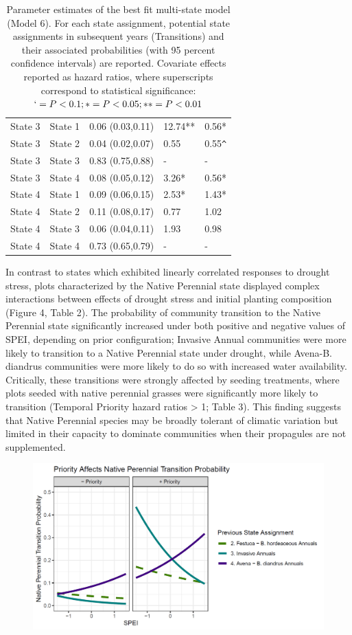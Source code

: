 \documentclass[twoside,12pt,final]{ucthesis-CA2012}
\begin{document}
\begin{ucmainmatter}
\begin{table}[ht]
\begin{tabular}{lllll}
  State 3 & State 1 & 0.06 (0.03,0.11) & 12.74** & 0.56* \\ 
  State 3 & State 2 & 0.04 (0.02,0.07) & 0.55 & 0.55\verb|^| \\ 
  State 3 & State 3 & 0.83 (0.75,0.88) & - & - \\ 
  State 3 & State 4 & 0.08 (0.05,0.12) & 3.26* & 0.56* \\ 
  State 4 & State 1 & 0.09 (0.06,0.15) & 2.53* & 1.43* \\ 
  State 4 & State 2 & 0.11 (0.08,0.17) & 0.77 & 1.02 \\ 
  State 4 & State 3 & 0.06 (0.04,0.11) & 1.93 & 0.98 \\ 
  State 4 & State 4 & 0.73 (0.65,0.79) & - & - \\ 
   \hline
\end{tabular}
\caption{Parameter estimates of the best fit multi-state model (Model 6). For each state assignment, potential state assignments in subsequent years (Transitions) and their associated probabilities (with 95 percent confidence intervals) are reported. Covariate effects reported as hazard ratios, where superscripts correspond to statistical significance: $` = P < 0.1; * = P < 0.05; ** = P < 0.01$} 
\end{table}
In contrast to states which exhibited linearly correlated responses to drought stress, plots characterized by the Native Perennial state displayed complex interactions between effects of drought stress and initial planting composition (Figure 4, Table 2).
The probability of community transition to the Native Perennial state significantly increased under both positive and negative values of SPEI, depending on prior configuration; Invasive Annual communities were more likely to transition to a Native Perennial state under drought, while Avena-B. diandrus communities were more likely to do so with increased water availability.
Critically, these transitions were strongly affected by seeding treatments, where plots seeded with native perennial grasses were significantly more likely to transition (Temporal Priority hazard ratios \textgreater{} 1; Table 3).
This finding suggests that Native Perennial species may be broadly tolerant of climatic variation but limited in their capacity to dominate communities when their propagules are not supplemented.
\begin{figure}
\centering
\includegraphics[width=\textwidth,height=0.4\textheight]{figure/Fig3_4.png}

\end{figure}
\end{ucmainmatter}
\end{document}
